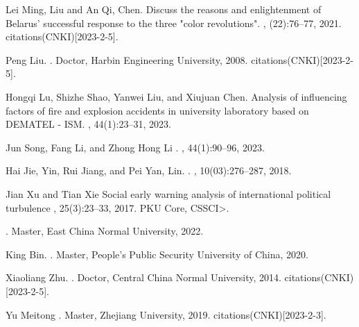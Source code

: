 \documentclass[12pt]{article}  %
\begin{document}
\begin{thebibliography}{100}
Lei Ming, Liu and An Qi, Chen.
\newblock
 Discuss the reasons and enlightenment of Belarus' successful response to the three "color revolutions".
, (22):76--77, 2021.
 citations(CNKI)[2023-2-5].

Peng Liu.
.
\newblock Doctor, Harbin Engineering University, 2008.
 citations(CNKI)[2023-2-5].

Hongqi Lu, Shizhe Shao, Yanwei Liu, and Xiujuan Chen.
\newblock
  {Analysis of influencing factors of fire and explosion accidents in university laboratory based on DEMATEL} - {ISM}.
, 44(1):23--31, 2023.

Jun Song, Fang Li, and Zhong Hong Li
.
, 44(1):90--96, 2023.

Hai Jie, Yin, Rui Jiang, and Pei Yan, Lin.
.
, 10(03):276--287,
  2018.


Jian Xu and Tian Xie
\newblock Social early warning analysis of international political turbulence
, 25(3):23--33,
  2017.
\newblock {\textless}PKU Core, CSSCI{\textgreater}.



.
\newblock Master, East China Normal University, 2022.

King Bin.
.
\newblock Master, People's Public Security University of China, 2020.



Xiaoliang Zhu.
.
\newblock Doctor, Central China Normal University, 2014.
 citations(CNKI)[2023-2-5].


Yu Meitong
.
\newblock Master, Zhejiang University, 2019.
 citations(CNKI)[2023-2-3].



\end{thebibliography}
\end{document}
